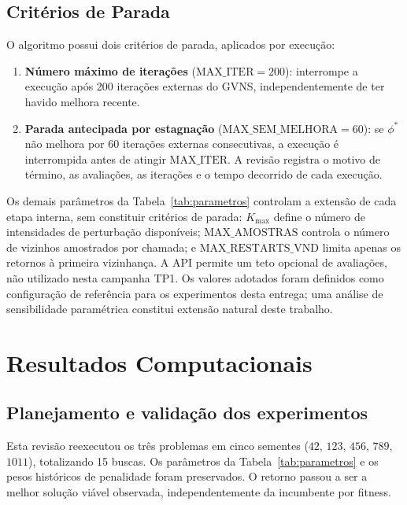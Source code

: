 \documentclass[12pt,a4paper]{article}
\begin{document}
\subsection{Critérios de Parada}

O algoritmo possui dois critérios de parada, aplicados por execução:

\begin{enumerate}
    \item \textbf{Número máximo de iterações} ($\text{MAX\_ITER} = 200$):
    interrompe a execução após 200 iterações externas do GVNS,
    independentemente de ter havido melhora recente.

    \item \textbf{Parada antecipada por estagnação}
    ($\text{MAX\_SEM\_MELHORA} = 60$): se $\phi^*$ não melhora por 60
    iterações externas consecutivas, a execução é interrompida antes de
    atingir $\text{MAX\_ITER}$. A revisão registra o motivo de término,
    as avaliações, as iterações e o tempo decorrido de cada execução.
\end{enumerate}

Os demais parâmetros da Tabela~\ref{tab:parametros} controlam a extensão
de cada etapa interna, sem constituir critérios de parada:
$K_{\max}$ define o número de intensidades de perturbação disponíveis;
$\text{MAX\_AMOSTRAS}$ controla o número de vizinhos amostrados por chamada;
e $\text{MAX\_RESTARTS\_VND}$ limita apenas os retornos à primeira vizinhança.
A API permite um teto opcional de avaliações, não utilizado nesta campanha TP1.
Os valores adotados foram definidos como configuração de referência para
os experimentos desta entrega; uma análise de sensibilidade paramétrica
constitui extensão natural deste trabalho.




\section{Resultados Computacionais}

\subsection{Planejamento e validação dos experimentos}

Esta revisão reexecutou os três problemas em cinco sementes ($42$, $123$, $456$, $789$, $1011$), totalizando 15 buscas. Os parâmetros da Tabela~\ref{tab:parametros} e os pesos históricos de penalidade foram preservados. O retorno passou a ser a melhor solução viável observada, independentemente da incumbente por fitness.
\end{document}

